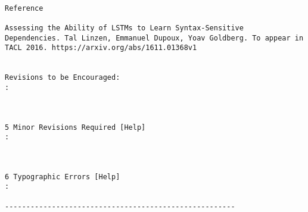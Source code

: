 \begin{verbatim}

Reference

Assessing the Ability of LSTMs to Learn Syntax-Sensitive
Dependencies. Tal Linzen, Emmanuel Dupoux, Yoav Goldberg. To appear in
TACL 2016. https://arxiv.org/abs/1611.01368v1


Revisions to be Encouraged:
: 



5 Minor Revisions Required [Help]
: 



6 Typographic Errors [Help]
: 

------------------------------------------------------
\end{verbatim}